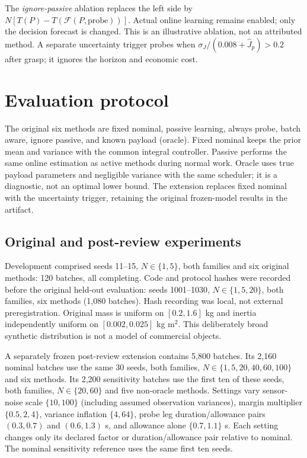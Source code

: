 \documentclass[10pt,twocolumn]{article}
\begin{document}
The \emph{ignore-passive} ablation replaces the left side by $N[T(P)-T(\mathcal F(P,\mathrm{probe}))]$. Actual online learning remains enabled; only the decision forecast is changed. This is an illustrative ablation, not an attributed method. A separate uncertainty trigger probes when $\sigma_J/(0.008+\hat J_p)>0.2$ after grasp; it ignores the horizon and economic cost.

\section{Evaluation protocol}
The original six methods are fixed nominal, passive learning, always probe, batch aware, ignore passive, and known payload (oracle). Fixed nominal keeps the prior mean and variance with the common integral controller. Passive performs the same online estimation as active methods during normal work. Oracle uses true payload parameters and negligible variance with the same scheduler; it is a diagnostic, not an optimal lower bound. The extension replaces fixed nominal with the uncertainty trigger, retaining the original frozen-model results in the artifact.

\subsection{Original and post-review experiments}
Development comprised seeds 11--15, $N\in\{1,5\}$, both families and six original methods: 120 batches, all completing. Code and protocol hashes were recorded before the original held-out evaluation: seeds 1001--1030, $N\in\{1,5,20\}$, both families, six methods (1,080 batches). Hash recording was local, not external preregistration. Original mass is uniform on $[0.2,1.6]$ kg and inertia independently uniform on $[0.002,0.025]$ kg m$^2$. This deliberately broad synthetic distribution is not a model of commercial objects.

A separately frozen post-review extension contains 5,800 batches. Its 2,160 nominal batches use the same 30 seeds, both families, $N\in\{1,5,20,40,60,100\}$ and six methods. Its 2,200 sensitivity batches use the first ten of these seeds, both families, $N\in\{20,60\}$ and five non-oracle methods. Settings vary sensor-noise scale $\{10,100\}$ (including assumed observation variances), margin multiplier $\{0.5,2,4\}$, variance inflation $\{4,64\}$, probe leg duration/allowance pairs $(0.3,0.7)$ and $(0.6,1.3)$ s, and allowance alone $\{0.7,1.1\}$ s. Each setting changes only its declared factor or duration/allowance pair relative to nominal. The nominal sensitivity reference uses the same first ten seeds.
\end{document}
